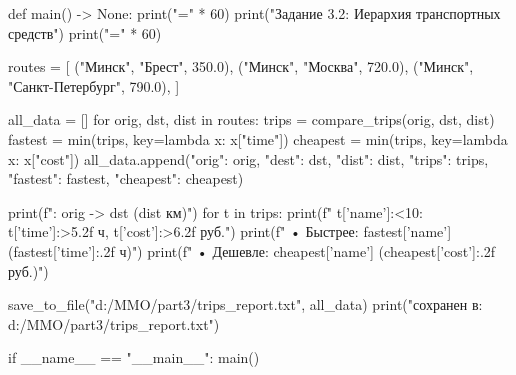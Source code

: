 \documentclass[14pt,a4paper]{extarticle}
\begin{document}
\begin{CodeListing}
def main() -> None:
    print("=" * 60)
    print("Задание 3.2: Иерархия транспортных средств")
    print("=" * 60)

    routes = [
        ("Минск", "Брест", 350.0),
        ("Минск", "Москва", 720.0),
        ("Минск", "Санкт-Петербург", 790.0),
    ]

    all_data = []
    for orig, dst, dist in routes:
        trips = compare_trips(orig, dst, dist)
        fastest = min(trips, key=lambda x: x["time"])
        cheapest = min(trips, key=lambda x: x["cost"])
        all_data.append({"orig": orig, "dest": dst, "dist": dist,
                         "trips": trips,
             "fastest": fastest, "cheapest": cheapest})

        print(f": {orig} -> {dst} ({dist} км)")
        for t in trips:
            print(f"  {t['name']:<10}: {t['time']:>5.2f} ч, {t['cost']:>6.2f} руб.")
        print(f"  • Быстрее: {fastest['name']} ({fastest['time']:.2f} ч)")
        print(f"  • Дешевле: {cheapest['name']} ({cheapest['cost']:.2f} руб.)")

    save_to_file("d:/MMO/part3/trips_report.txt", all_data)
    print(" сохранен в: d:/MMO/part3/trips_report.txt")


if __name__ == "__main__":
    main()
\end{CodeListing}
\end{document}
